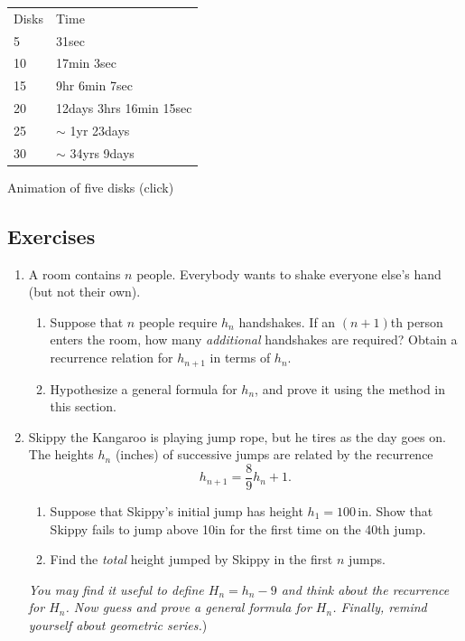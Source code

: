 \begin{center}
\begin{minipage}{0.4\textwidth}
\begin{tabular}{ll}
Disks&Time\\
5&31sec\\
10&17min 3sec\\
15&9hr 6min 7sec\\
20&12days 3hrs 16min 15sec\\
25&$\sim$ 1yr 23days\\
30&$\sim$ 34yrs 9days
\end{tabular}
\end{minipage}
\begin{minipage}{0.55\textwidth}
\centering
{}

Animation of five disks (click)
\end{minipage}
\end{center}


\subsection*{Exercises}

\begin{enumerate}\renewcommand{\labelenumi}{\thesubsection.\theenumi}
    \item A room contains $n$ people. Everybody wants to shake everyone else's hand (but not their own).
    \begin{enumerate}
      \item Suppose that $n$ people require $h_n$ handshakes. If an $(n+1)$th person enters the room, how many \emph{additional} handshakes are required? Obtain a recurrence relation for $h_{n+1}$ in terms of $h_n$.
      \item Hypothesize a general formula for $h_n$, and prove it using the method in this section.
    \end{enumerate}
  
  \item Skippy the Kangaroo is playing jump rope, but he tires as the day goes on. The heights $h_n$ (inches) of successive jumps are related by the recurrence 
  \[h_{n+1}=\frac 8{9} h_n+1.\]
  \begin{enumerate}
  	\item Suppose that Skippy's initial jump has height $h_1=100\,$in. Show that Skippy fails to jump above 10in for the first time on the 40th jump.
  	\item Find the \emph{total} height jumped by Skippy in the first $n$ jumps.
  \end{enumerate}
  \emph{You may find it useful to define $H_n=h_n-9$ and think about the recurrence for $H_n$. Now guess and prove a general formula for $H_n$. Finally, remind yourself about geometric series.})
\end{enumerate}
\newpage

